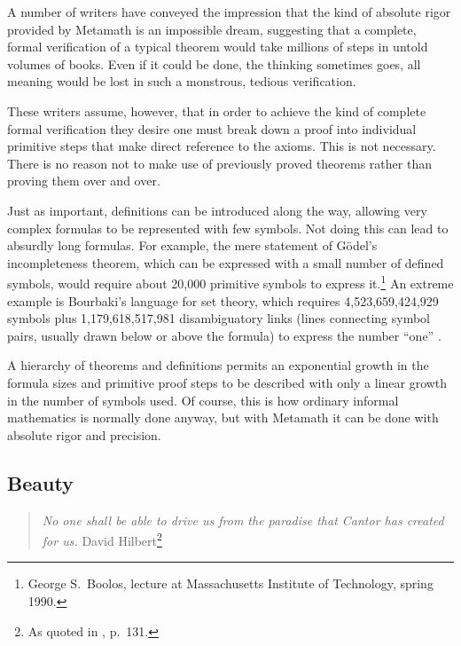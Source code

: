 A number of writers have conveyed the impression that the kind of absolute
rigor provided by Metamath is an impossible dream, suggesting
that a complete, formal verification of a typical theorem
would take millions of steps in untold volumes of books.  Even if it could be
done, the thinking sometimes goes, all meaning would be lost in such a
monstrous, tedious verification.

These writers assume, however, that in order to achieve the kind of complete
formal verification they desire one must break down a proof into individual
primitive steps that make direct reference to the axioms.  This is
not necessary.  There is no reason not to make use of previously proved
theorems rather than proving them over and over.

Just as important, definitions can be introduced along
the way, allowing very complex formulas to be represented with few
symbols.  Not doing this can lead to absurdly long formulas.  For
example, the mere statement of
G\"{o}del's incompleteness theorem, which can be expressed with a small number of
defined symbols, would require about 20,000 primitive symbols to express
it.\footnote{George S.\ Boolos, lecture at
Massachusetts Institute of Technology, spring 1990.} An extreme example
is Bourbaki's\label{bourbaki} language for set theory, which requires
4,523,659,424,929 symbols plus 1,179,618,517,981 disambiguatory links
(lines connecting symbol pairs, usually drawn below or above the
formula) to express the number
``one'' \cite{Mathias}.

A hierarchy of theorems and definitions permits an
exponential growth in the formula sizes and primitive proof steps to be
described with only a linear growth in the number of symbols used.  Of course,
this is how ordinary informal mathematics is normally done anyway, but with
Metamath it can be done with absolute rigor and precision.

\subsection{Beauty}


\begin{quote}
  {\em No one shall be able to drive us from the paradise that Cantor has
created for us.}
   \flushright\sc  David Hilbert\footnote{As quoted in \cite{Moore}, p.~131.}\\
\end{quote}

